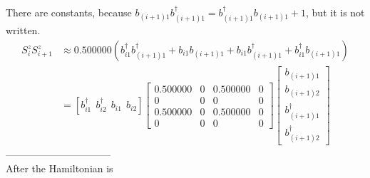 \documentclass[letter]{article}
\begin{document}
There are constants, because $b_{(i+1)1}b_{(i+1)1}^{\dagger}=b_{(i+1)1}^{\dagger}b_{(i+1)1}+1$, but it is not written.
$$
\begin{aligned}
    S_{i}^z S_{i+1}^z &\approx0.500000\left(b_{i1}^{\dagger}b_{(i+1)1}^{\dagger}+b_{i1}b_{(i+1)1}+b_{i1}b_{(i+1)1}^{\dagger}+b_{i1}^{\dagger}b_{(i+1)1}\right)\\ &=\left[
        b_{i1}^{\dagger} \ \ 
        b_{i2}^{\dagger}\  \ 
        b_{i1}\ \ 
        b_{i2}\right]
       \begin{bmatrix}
            0.500000 & 0 & 0.500000 & 0 \\
           0 &  0 & 0 &0 \\
            0.500000 &  0 & 0.500000 &0\\
            0 & 0 & 0& 0
            \end{bmatrix}\begin{bmatrix}
                b_{(i+1)1}  \\
                b_{(i+1)2}  \\
                b_{(i+1)1}^{\dagger}\\
                b_{(i+1)2}^{\dagger}
                \end{bmatrix}
\end{aligned}
$$
--------------------------------\\
After the Hamiltonian is 
\end{document}
